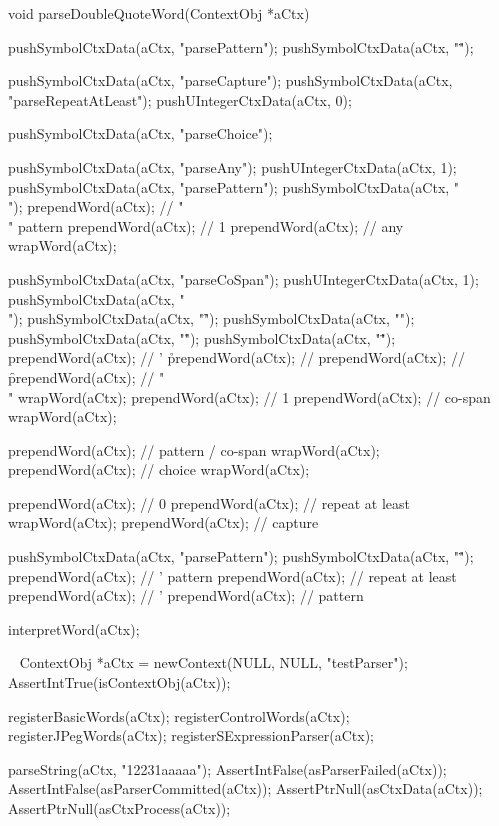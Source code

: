 \startCCode
void parseDoubleQuoteWord(ContextObj *aCtx) {

  pushSymbolCtxData(aCtx, "parsePattern");
  pushSymbolCtxData(aCtx, "\"");

  pushSymbolCtxData(aCtx, "parseCapture");
  pushSymbolCtxData(aCtx, "parseRepeatAtLeast");
  pushUIntegerCtxData(aCtx, 0);

  pushSymbolCtxData(aCtx, "parseChoice");

  pushSymbolCtxData(aCtx, "parseAny");
  pushUIntegerCtxData(aCtx, 1);
  pushSymbolCtxData(aCtx, "parsePattern");
  pushSymbolCtxData(aCtx, "\\");
  prependWord(aCtx);  // "\\" pattern
  prependWord(aCtx);  // 1
  prependWord(aCtx);  // any
  wrapWord(aCtx);

  pushSymbolCtxData(aCtx, "parseCoSpan");
  pushUIntegerCtxData(aCtx, 1);
  pushSymbolCtxData(aCtx, "\\");
  pushSymbolCtxData(aCtx, "\f");
  pushSymbolCtxData(aCtx, "\n");
  pushSymbolCtxData(aCtx, "\r");
  pushSymbolCtxData(aCtx, "\"");
  prependWord(aCtx);  // ' \r
  prependWord(aCtx);  // \n
  prependWord(aCtx);  // \f
  prependWord(aCtx);  // "\\"
  wrapWord(aCtx);
  prependWord(aCtx);  // 1
  prependWord(aCtx);  // co-span
  wrapWord(aCtx);
  
  prependWord(aCtx);  // pattern / co-span
  wrapWord(aCtx);
  prependWord(aCtx);  // choice
  wrapWord(aCtx);
  
  prependWord(aCtx);  // 0
  prependWord(aCtx);  // repeat at least
  wrapWord(aCtx);
  prependWord(aCtx);  // capture
  
  pushSymbolCtxData(aCtx, "parsePattern");
  pushSymbolCtxData(aCtx, "\"");
  prependWord(aCtx);  // ' pattern
  prependWord(aCtx);  // repeat at least
  prependWord(aCtx);  // '
  prependWord(aCtx);  // pattern

  interpretWord(aCtx);
}
\stopCCode

\CTestsSuiteSetup\
\startCTest
  ContextObj *aCtx = newContext(NULL, NULL, "testParser");
  AssertIntTrue(isContextObj(aCtx));
  
  registerBasicWords(aCtx);
  registerControlWords(aCtx);
  registerJPegWords(aCtx);
  registerSExpressionParser(aCtx);
\stopCTest

\startCTest
  parseString(aCtx, "12231aaaaa");
  AssertIntFalse(asParserFailed(aCtx));
  AssertIntFalse(asParserCommitted(aCtx));
  AssertPtrNull(asCtxData(aCtx));
  AssertPtrNull(asCtxProcess(aCtx));

